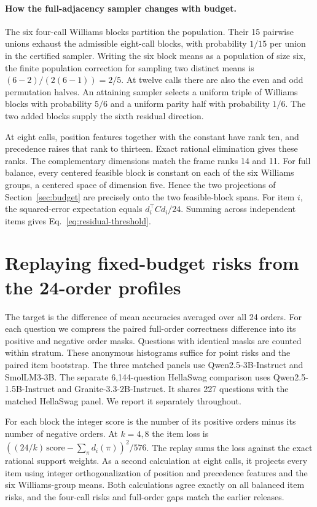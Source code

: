 \paragraph{How the full-adjacency sampler changes with budget.}
The six four-call Williams blocks partition the population. Their
15 pairwise unions exhaust the admissible eight-call blocks, with
probability $1/15$ per union in the certified sampler. Writing the six
block means as a population of size six, the finite population
correction for sampling two distinct means is $(6-2)/(2(6-1))=2/5$.
At twelve calls there are also the even and odd permutation halves.
An attaining sampler selects a uniform triple of Williams blocks
with probability $5/6$ and a uniform parity half with probability $1/6$.
The two added blocks supply the sixth residual direction.

At eight calls, position features together with the constant have
rank ten, and precedence raises that rank to thirteen. Exact rational
elimination gives these ranks. The complementary dimensions match
the frame ranks 14 and 11. For full balance, every centered feasible
block is constant on each of the six Williams groups, a centered space
of dimension five. Hence the two projections of
Section~\ref{sec:budget} are precisely onto the two feasible-block
spans. For item $i$, the squared-error expectation equals
$d_i^\top C d_i/24$. Summing across independent items gives
Eq.~\eqref{eq:residual-threshold}.

\section{Replaying fixed-budget risks from the 24-order profiles}
\label{app:eight-replay}

The target is the difference of mean accuracies averaged over all 24
orders. For each question we compress the paired full-order correctness
difference into its positive and negative order masks. Questions with
identical masks are counted within stratum. These anonymous histograms
suffice for point risks and the paired item bootstrap. The three
matched panels use Qwen2.5-3B-Instruct and SmolLM3-3B. The separate
6,144-question HellaSwag comparison uses Qwen2.5-1.5B-Instruct and
Granite-3.3-2B-Instruct. It shares 227 questions with the matched
HellaSwag panel. We report it separately throughout.

For each block the integer score is the number of its positive
orders minus its number of negative orders. At $k=4,8$ the item
loss is $((24/k)\,\mathrm{score}-\sum_\pi d_i(\pi))^2/576$.
The replay sums the loss against the exact rational support weights.
As a second calculation at eight calls, it projects every item
using integer orthogonalization of position and precedence features
and the six Williams-group means. Both calculations agree exactly on
all balanced item risks, and the four-call risks and full-order gaps
match the earlier releases.


